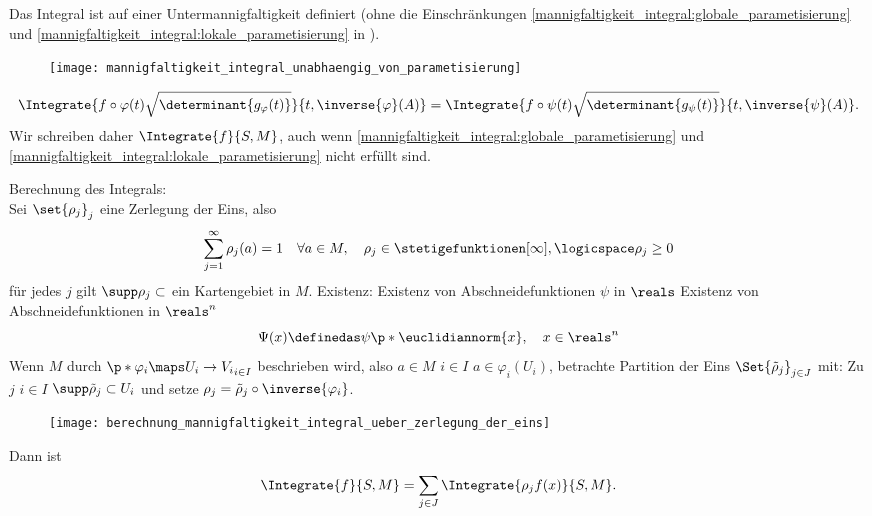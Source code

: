 \begin{folgerung}\label{berechnung_mannigfaltigkeit_integral_ueber_zerlegung_der_eins}
  Das Integral ist auf einer Untermannigfaltigkeit definiert (ohne die Einschränkungen \ref{mannigfaltigkeit_integral:globale_parametisierung} und \ref{mannigfaltigkeit_integral:lokale_parametisierung} in ).
  \begin{figure}[H]
    \centering
    \texttt{[image: mannigfaltigkeit\_integral\_unabhaengig\_von\_parametisierung]}
    \label{fig:mannigfaltigkeit_integral_unabhaengig_von_parametisierung}
  \end{figure}
  \begin{equation*}
    \Integrate{f\circ \varphi(t)\sqrt{\determinant{g_{\varphi}(t)}}}{t,\inverse{\varphi}(A)}=\Integrate{f\circ \psi(t)\sqrt{\determinant{g_{\psi}(t)}}}{t,\inverse{\psi}(A)}.
  \end{equation*}
  Wir schreiben daher \( \Integrate{f}{S,M} \), auch wenn \ref{mannigfaltigkeit_integral:globale_parametisierung} und \ref{mannigfaltigkeit_integral:lokale_parametisierung} nicht erfüllt sind. 

  Berechnung des Integrals:\\
  Sei \( \set{\rho_j}_j \) eine Zerlegung der Eins, also
  \begin{equation*}
    \sum_{j=1}^{\infty}\rho_j(a)=1 \quad \forall a\in M,\quad \rho_j\in \stetigefunktionen[\infty], \logicspace\rho_j\geq 0
  \end{equation*}
  \sd für jedes \( j \) gilt \( \supp \rho_j\subset  \) ein Kartengebiet in \( M \).
  Existenz: Existenz von Abschneidefunktionen \( \psi \) in \( \reals \) \timplies Existenz von Abschneidefunktionen in \( \reals^n \)
  \begin{equation}
    \Psi(x)\definedas \psi\p*{\euclidiannorm{x}},\quad x\in \reals^n
  \end{equation}
  \timplies Wenn \( M \) durch 
  \( \p*{\varphi_i\maps U_i\to V_i}_{i\in I} \)
   beschrieben wird,
    also \tforall \( a\in M \) \texists \( i\in I \) \sd \( a\in \varphi_i(U_i) \), betrachte Partition der Eins \( \Set{\tilde{\rho}_j}_{j\in J} \) mit: Zu \( j \) \texists \( i\in I \) \sd \( \supp \tilde{\rho}_j\subset U_i \) und setze \( \rho_j=\tilde{\rho}_j\circ \inverse{\varphi_i} \).
  \begin{figure}[H]
    \centering
    \texttt{[image: berechnung\_mannigfaltigkeit\_integral\_ueber\_zerlegung\_der\_eins]}
    \label{fig:berechnung_mannigfaltigkeit_integral_ueber_zerlegung_der_eins}
  \end{figure}
  Dann ist 
  \begin{equation*}
    \Integrate{f}{S,M}=\sum_{j\in J} \Integrate{\rho_j f(x)}{S,M}.
  \end{equation*}
\end{folgerung}
